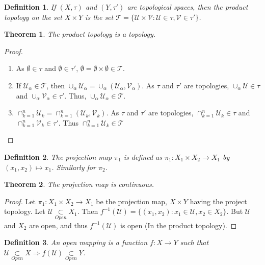 \documentclass[12pt,oneside]{book}
\theoremstyle{mystyle}
\newtheorem{theorem}{Theorem}[section]
\newtheorem{definition}{Definition}[section]
\begin{document}
\begin{definition}
If $(X,\tau)$ and $(Y,\tau')$ are topological spaces, then the product topology on the set $X\times Y$ is the set $\mathscr{T} = \{\mathcal{U}\times \mathcal{V}:\mathcal{U}\in\tau,\mathcal{V}\in \tau'\}$.
\end{definition}

\begin{theorem}
The product topology is a topology.
\end{theorem}
\begin{proof}
\
\begin{enumerate}
\item As $\emptyset \in \tau$ and $\emptyset\in \tau'$, $\emptyset =\emptyset\times \emptyset \in \mathscr{T}$.
\item If $\mathscr{U}_{\alpha}\in \mathscr{T}$, then $\cup_{\alpha} \mathscr{U}_{\alpha} = \cup_{\alpha} (\mathcal{U}_{\alpha},\mathcal{V}_{\alpha})$. As $\tau$ and $\tau'$ are topologies, $\cup_{\alpha} \mathcal{U} \in \tau$ and $\cup_{\alpha}\mathcal{V}_{\alpha} \in \tau'$. Thus, $\cup_{\alpha}\mathscr{U}_{\alpha} \in \mathscr{T}$.
\item $\cap_{k=1}^{n} \mathscr{U}_{k} = \cap_{k=1}^{n} (\mathcal{U}_k,\mathcal{V}_k)$. As $\tau$ and $\tau'$ are topologies, $\cap_{k=1}^{n}\mathcal{U}_k \in \tau$ and $\cap_{k=1}^{n}\mathcal{V}_{k} \in \tau'$. Thus $\cap_{k=1}^{n} \mathscr{U}_k \in \mathscr{T}$
\end{enumerate}
\end{proof}

\begin{definition}
The projection map $\pi_1$ is defined as $\pi_1:X_1\times X_2\rightarrow X_1$ by $(x_1,x_2)\mapsto x_1$. Similarly for $\pi_2$.
\end{definition}

\begin{theorem}
The projection map is continuous.
\end{theorem}
\begin{proof}
Let $\pi_1:X_1\times X_2\rightarrow X_1$ be the projection map, $X\times Y$ having the project topology. Let $\mathcal{U}\underset{Open}\subset X_1$. Then $f^{-1}(\mathcal{U}) = \{(x_1,x_2):x_1\in \mathcal{U}, x_2\in X_2\}$. But $\mathcal{U}$ and $X_2$ are open, and thus $f^{-1}(\mathcal{U})$ is open (In the product topology).
\end{proof}

\begin{definition}
An open mapping is a function $f:X\rightarrow Y$ such that $\mathcal{U}\underset{Open}\subset X\Rightarrow f(\mathcal{U}) \underset{Open}\subset Y$.
\end{definition}
\end{document}
